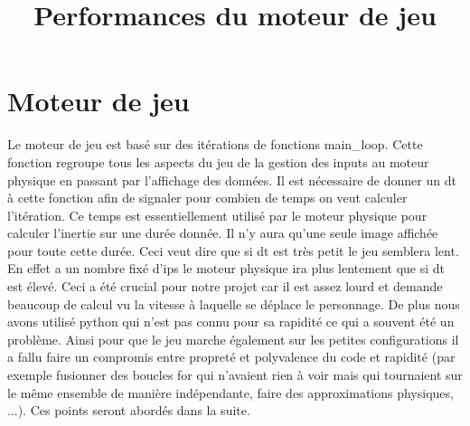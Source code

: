 \documentclass[11pt]{article}
\title{\textbf{Performances du moteur de jeu}}
\begin{document}
\maketitle

\section{Moteur de jeu}
Le moteur de jeu est basé sur des itérations de fonctions main\_loop. Cette fonction regroupe tous les aspects du jeu de la gestion des inputs au moteur physique en passant par l'affichage des données. Il est nécessaire de donner un dt à cette fonction afin de signaler pour combien de temps on veut calculer l'itération. Ce temps est essentiellement utilisé par le moteur physique pour calculer l'inertie sur une durée donnée. Il n'y aura qu'une seule image affichée pour toute cette durée. Ceci veut dire que si dt est très petit le jeu semblera lent. En effet a un nombre fixé d'ips le moteur physique ira plus lentement que si dt est élevé. Ceci a été crucial pour notre projet car il est assez lourd et demande beaucoup de calcul vu la vitesse à laquelle se déplace le personnage. De plus nous avons utilisé python qui n'est pas connu pour sa rapidité ce qui a souvent été un problème. Ainsi pour que le jeu marche également sur les petites configurations il a fallu faire un compromis entre propreté et polyvalence du code et rapidité (par exemple fusionner des boucles for qui n'avaient rien à voir mais qui tournaient sur le même ensemble de manière indépendante, faire des approximations physiques, ...). Ces points seront abordés dans la suite.
\end{document}
